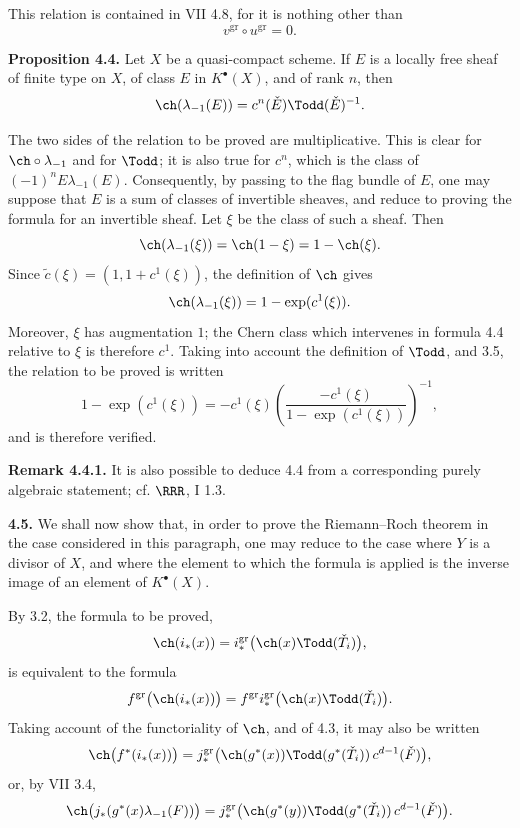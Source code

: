 This relation is contained in VII 4.8, for it is nothing other than
\[
 v^{\mathrm{gr}}\circ u^{\mathrm{gr}}=0 .
\]

\textbf{Proposition 4.4.} Let \(X\) be a quasi-compact scheme. If \(E\) is a locally free sheaf of finite type on \(X\), of class \(E\) in \(K^{\bullet}(X)\), and of rank \(n\), then
\[
 \ch(\lambda_{-1}(E))=c^n(\check E)\Todd(\check E)^{-1}.
\]

The two sides of the relation to be proved are multiplicative. This is clear for \(\ch\circ\lambda_{-1}\) and for \(\Todd\); it is also true for \(c^n\), which is the class of \((-1)^nE\lambda_{-1}(E)\). Consequently, by passing to the flag bundle of \(E\), one may suppose that \(E\) is a sum of classes of invertible sheaves, and reduce to proving the formula for an invertible sheaf. Let \(\xi\) be the class of such a sheaf. Then
\[
 \ch(\lambda_{-1}(\xi))=\ch(1-\xi)=1-\ch(\xi).
\]
Since \(\widetilde c(\xi)=(1,1+c^1(\xi))\), the definition of \(\ch\) gives
\[
 \ch(\lambda_{-1}(\xi))=1-\exp(c^1(\xi)).
\]
Moreover, \(\xi\) has augmentation \(1\); the Chern class which intervenes in formula 4.4 relative to \(\xi\) is therefore \(c^1\). Taking into account the definition of \(\Todd\), and 3.5, the relation to be proved is written
\[
 1-\exp(c^1(\xi))
 =
 -c^1(\xi)\left(\frac{-c^1(\xi)}{1-\exp(c^1(\xi))}\right)^{-1},
\]
and is therefore verified.

\textbf{Remark 4.4.1.} It is also possible to deduce 4.4 from a corresponding purely algebraic statement; cf. \(\RRR\), I 1.3.

\textbf{4.5.} We shall now show that, in order to prove the Riemann--Roch theorem in the case considered in this paragraph, one may reduce to the case where \(Y\) is a divisor of \(X\), and where the element to which the formula is applied is the inverse image of an element of \(K^{\bullet}(X)\).

By 3.2, the formula to be proved,
\[
 \ch(i_*(x))=
 i^{\mathrm{gr}}_*\bigl(\ch(x)\Todd(\check T_i)\bigr),
\]
is equivalent to the formula
\[
 f^{\mathrm{gr}}\bigl(\ch(i_*(x))\bigr)
 =
 f^{\mathrm{gr}}i^{\mathrm{gr}}_*\bigl(\ch(x)\Todd(\check T_i)\bigr).
\]
Taking account of the functoriality of \(\ch\), and of 4.3, it may also be written
\[
 \ch\bigl(f^*(i_*(x))\bigr)
 =
 j^{\mathrm{gr}}_*\bigl(\ch(g^*(x))\Todd(g^*(\check T_i))\,c^{d-1}(\check F)\bigr),
\]
or, by VII 3.4,
\[
 \ch\bigl(j_*(g^*(x)\lambda_{-1}(F))\bigr)
 =
 j^{\mathrm{gr}}_*\bigl(\ch(g^*(y))\Todd(g^*(\check T_i))\,c^{d-1}(\check F)\bigr).
\]

